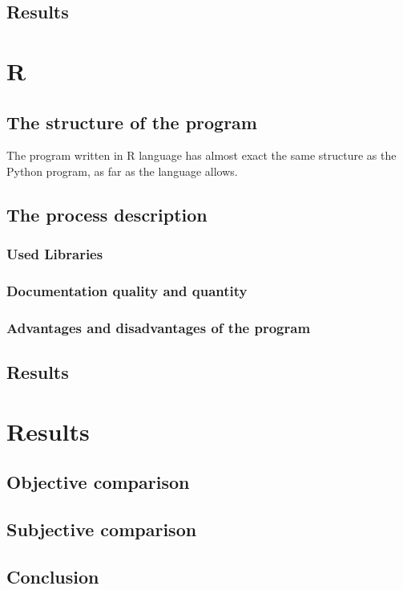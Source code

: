 \documentclass{article}
\begin{document}
\subsection{Results}

\newpage
\section{R}
\subsection{The structure of the program}
The program written in R language has almost exact the same structure as the Python program, as far as the language allows. 
\subsection{The process description}
\subsubsection{Used Libraries}
\subsubsection{Documentation quality and quantity}
\subsubsection{Advantages and disadvantages of the program}
\subsection{Results}

\newpage
\section{Results}
\subsection{Objective comparison}
\subsection{Subjective comparison}
\subsection{Conclusion}

\newpage
\end{document}
